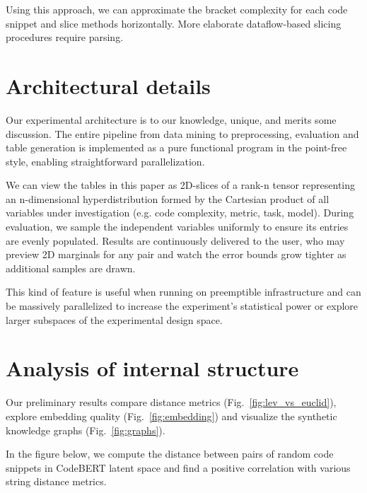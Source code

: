 \documentclass[sigconf,review,anonymous]{acmart}
\begin{document}
  Using this approach, we can approximate the bracket complexity for each code snippet and slice methods horizontally. More elaborate dataflow-based slicing procedures require parsing.

  \section{Architectural details}\label{sec:architecture}

  Our experimental architecture is to our knowledge, unique, and merits some discussion. The entire pipeline from data mining to preprocessing, evaluation and table generation is implemented as a pure functional program in the point-free style, enabling straightforward parallelization.

  We can view the tables in this paper as 2D-slices of a rank-n tensor representing an n-dimensional hyperdistribution formed by the Cartesian product of all variables under investigation (e.g. code complexity, metric, task, model). During evaluation, we sample the independent variables uniformly to ensure its entries are evenly populated. Results are continuously delivered to the user, who may preview 2D marginals for any pair and watch the error bounds grow tighter as additional samples are drawn.

  This kind of feature is useful when running on preemptible infrastructure and can be massively parallelized to increase the experiment's statistical power or explore larger subspaces of the experimental design space.

  \pagebreak\section{Analysis of internal structure}\label{sec:probe_internals}

  Our preliminary results compare distance metrics (Fig.~\ref{fig:lev_vs_euclid}), explore embedding quality (Fig.~\ref{fig:embedding}) and visualize the synthetic knowledge graphs (Fig.~\ref{fig:graphs}).

  In the figure below, we compute the distance between pairs of random code snippets in CodeBERT latent space and find a positive correlation with various string distance metrics.
\end{document}

